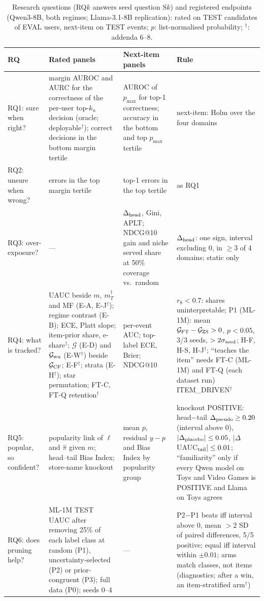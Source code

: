 \begin{table}[tp]
\caption{Research questions (RQ$k$ answers seed question S$k$) and registered endpoints (Qwen3-8B, both regimes; Llama-3.1-8B
replication): rated on TEST candidates of EVAL users, next-item on TEST events; $p$: list-normalised probability; $^\dagger$:
addenda 6--8.}
\label{tab:rq}
\scriptsize
\setlength{\tabcolsep}{4pt}\renewcommand{\arraystretch}{0.92}
\begin{tabular}{@{}p{}p{}p{}p{}@{}}
\toprule
RQ & Rated panels & Next-item panels & Rule\\\midrule
\raggedright RQ1: sure when right? & margin AUROC and AURC for the correctness of the per-user top-$k_u$ decision (oracle; deployable$^\dagger$); correct decisions in the bottom margin tertile & AUROC of $p_{\max}$ for top-1 correctness; accuracy in the bottom and top $p_{\max}$ tertile & next-item: Holm over the four domains\\
\raggedright RQ2: unsure when wrong? & errors in the top margin tertile & top-1 errors in the top tertile & as RQ1\\
\raggedright RQ3: over-exposure? & --- & $\Delta_{\rm head}$, Gini, APLT; NDCG@10 gain and niche served share at 50\% coverage vs.\ random & $\Delta_{\rm head}$: one sign, interval excluding 0, in $\ge3$ of 4 domains; static only\\
\raggedright RQ4: what is tracked? & UAUC beside $m$, $m_T^\dagger$ and MF (E-A, E-J$^\dagger$); regime contrast (E-B); ECE, Platt slope; item-prior share, e-share$^\dagger$; $\mathcal G$ (E-D) and $\mathcal G_{\rm wu}$ (E-W$^\dagger$) beside $\mathcal G_{\rm CF}$; E-F$^\dagger$; strata (E-H$^\dagger$); star permutation; FT-C, FT-Q retention$^\dagger$ & per-event AUC; top-label ECE, Brier; NDCG@10 & $r_8<0.7$: shares uninterpretable; P1 (ML-1M): mean $\mathcal G_{\rm FT}-\mathcal G_{\rm ZS}>0$, $p<0.05$, 3/3 seeds, $>2\sigma_{\rm seed}$; H-F, H-S, H-J$^\dagger$; ``teaches the item'' needs FT-C (ML-1M) and FT-Q (each dataset run) ITEM\_DRIVEN$^\dagger$\\
\raggedright RQ5: popular, so confident? & popularity link of $\ell$ and $\hat\pi$ given $m$; head--tail Bias Index; store-name knockout & mean $p$, residual $y-p$ and Bias Index by popularity group & knockout POSITIVE: head$-$tail $\Delta_{\rm pseudo}\ge0.20$ (interval above 0), $|\Delta_{\rm placebo}|\le0.05$, $|\Delta$UAUC$_{\rm tail}|\le0.01$; ``familiarity'' only if every Qwen model on Toys and Video Games is POSITIVE and Llama on Toys agrees\\
\raggedright RQ6: does pruning help? & ML-1M TEST UAUC after removing 25\% of each label class at random (P1), uncertainty-selected (P2) or prior-congruent (P3); full data (P0); seeds 0--4 & --- & P2$-$P1 beats iff interval above 0, mean $>2$ SD of paired differences, 5/5 positive; equal iff interval within $\pm0.01$; arms match classes, not items (diagnostics; after a win, an item-stratified arm$^\dagger$)\\
\bottomrule
\end{tabular}
\end{table}
